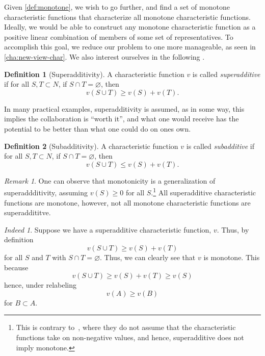 \documentclass[12pt,letterpaper,final]{article}
\theoremstyle{plain}
\theoremstyle{plain}
\theoremstyle{plain}
\theoremstyle{plain}
\theoremstyle{plain}
\theoremstyle{plain}
\theoremstyle{plain}
\theoremstyle{definition}
\newtheorem{definition}{Definition}[section]
\theoremstyle{definition}
\theoremstyle{definition}
\theoremstyle{definition}
\theoremstyle{definition}
\theoremstyle{remark}
\newtheorem*{remark}{Remark}
\theoremstyle{remark}
\theoremstyle{remark}
\theoremstyle{remark}
\newtheorem*{indeed}{Indeed}
\begin{document}
Given \cref{def:monotone}, we wish to go further, and find
a set of monotone characteristic functions that characterize all
monotone characteristic functions.
Ideally, we would be able to construct any monotone
characteristic function as a positive linear combination of
members of some set of
representatives. To accomplish this goal, we reduce our problem to one
more manageable, as seen in \cref{cha:new-view-char}. We also interest
ourselves in the following .

\begin{definition}[Superadditivity]\label{def:superadditvity}
  A characteristic function \(v\) is called \emph{superadditive} if for
  all \(S, T \subset N\), if \(S\cap T = \varnothing\), then
  \[
    v(S\cup T) \geq v(S) +v(T).
  \]
\end{definition}

In many practical examples, superadditivity is assumed, as in some
way, this implies the collaboration is ``worth it'', and what one would
receive has the potential to be better than what one could do on ones own.

\begin{definition}[Subadditivity]\label{def:subadditivity}
  A characteristic function \(v\) is called \emph{subadditive} if for
  all \(S, T \subset N\), if \(S\cap T = \varnothing\), then
  \[
    v(S\cup T) \leq v(S) +v(T).
  \]
\end{definition}

\begin{remark}
  One can observe that monotonicity is a generalization of
  superaddditivity, assuming \(v(S)\geq 0\) for all
  \(S\).\footnote{This is contrary to~\cite{Weber78}, where
    they do not assume that the characteristic functions take on
    non-negative values, and hence, superadditive does not imply
    monotone.} All
  superadditive characteristic functions are monotone, however, not
  all monotone characteristic functions are superaddititve.
\end{remark}

\begin{indeed}
  Suppose we have a superadditive characteristic function,
  \(v\). Thus, by definition
  \[
    v(S\cup T) \geq v(S) + v(T)
  \]
  for all \(S\) and \(T\) with \(S\cap T=\varnothing\).
  Thus, we can clearly see that \(v\) is monotone. This because
  \[
    v(S\cup T) \geq v(S) + v(T) \geq v(S)
  \]
  hence, under relabeling
  \[
    v(A) \geq v(B) 
  \]
  for \(B \subset A\).
\end{indeed}
\end{document}

